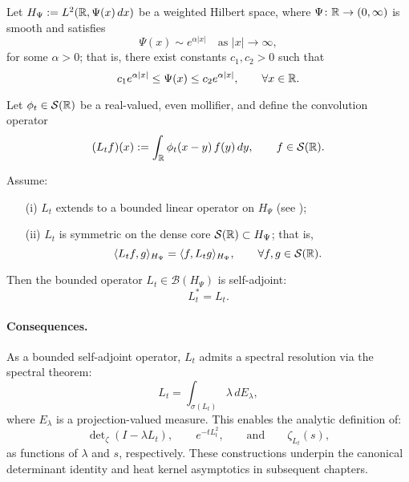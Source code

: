 \begin{proposition}
\label{prop:selfadjointness_Lt}
Let \( H_\Psi := L^2(\mathbb{R}, \Psi(x)\, dx) \) be a weighted Hilbert space, where \( \Psi \colon \mathbb{R} \to (0,\infty) \) is smooth and satisfies
\[
\Psi(x) \sim e^{\alpha|x|} \quad \text{as } |x| \to \infty,
\]
for some \( \alpha > 0 \); that is, there exist constants \( c_1, c_2 > 0 \) such that
\[
c_1 e^{\alpha |x|} \le \Psi(x) \le c_2 e^{\alpha |x|}, \qquad \forall x \in \mathbb{R}.
\]

Let \( \phi_t \in \mathcal{S}(\mathbb{R}) \) be a real-valued, even mollifier, and define the convolution operator
\[
(L_t f)(x) := \int_{\mathbb{R}} \phi_t(x - y)\, f(y)\, dy, \qquad f \in \mathcal{S}(\mathbb{R}).
\]

Assume:
\begin{itemize}
    \item[\textup{(i)}] \( L_t \) extends to a bounded linear operator on \( H_\Psi \) (see );
    \item[\textup{(ii)}] \( L_t \) is symmetric on the dense core \( \mathcal{S}(\mathbb{R}) \subset H_\Psi \); that is,
    \[
    \langle L_t f, g \rangle_{H_\Psi} = \langle f, L_t g \rangle_{H_\Psi}, \qquad \forall f, g \in \mathcal{S}(\mathbb{R}).
    \]
\end{itemize}

Then the bounded operator \( L_t \in \mathcal{B}(H_\Psi) \) is self-adjoint:
\[
L_t^* = L_t.
\]

\paragraph{Consequences.}
As a bounded self-adjoint operator, \( L_t \) admits a spectral resolution via the spectral theorem:
\[
L_t = \int_{\sigma(L_t)} \lambda\, dE_\lambda,
\]
where \( E_\lambda \) is a projection-valued measure. This enables the analytic definition of:
\[
\det\nolimits_\zeta(I - \lambda L_t), \qquad e^{-t L_t^2}, \qquad \text{and} \qquad \zeta_{L_t}(s),
\]
as functions of \( \lambda \) and \( s \), respectively. These constructions underpin the canonical determinant identity and heat kernel asymptotics in subsequent chapters.
\end{proposition}
